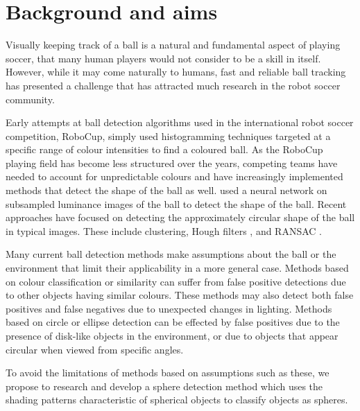 \documentclass[11pt]{scrartcl}
\begin{document}
    \section{Background and aims} {

        Visually keeping track of a ball is a natural and fundamental aspect of playing
        soccer, that many human players would not consider to be a skill in itself.
        However, while it may come naturally to humans, fast and reliable ball
        tracking has presented a challenge that has attracted much research in
        the robot soccer community.

        Early attempts at ball detection algorithms used in the international robot soccer competition,
        RoboCup, simply used histogramming techniques targeted at a specific range of colour intensities to find a coloured ball. As the RoboCup playing field has become less structured over the years, competing teams have needed to account for unpredictable colours and have increasingly implemented methods that detect the shape of the ball as well.
        \citet{schulz2007ball} used a neural network on
        subsampled luminance images of the ball to detect the shape of the
        ball. Recent approaches have focused on detecting the approximately
        circular shape of the ball in typical images. These include
        clustering, Hough filters \citet{li2013survey}, and RANSAC \citep{annable2013nubots}.



        Many current ball detection methods make assumptions about the ball or
        the environment that limit their applicability in a more general case. Methods
        based on colour classification or similarity can suffer from false
        positive detections due to other objects having similar colours. These methods may
        also detect both false positives and false negatives due to unexpected changes
        in lighting. Methods based on circle or ellipse detection can be effected by
        false positives due to the presence of disk-like objects in the
        environment, or due to objects that appear circular when viewed from
        specific angles.

        To avoid the limitations of methods based on assumptions such as
        these, we propose to research and develop a sphere detection method which uses
        the shading patterns characteristic of spherical objects to classify
        objects as spheres.

}
\end{document}
